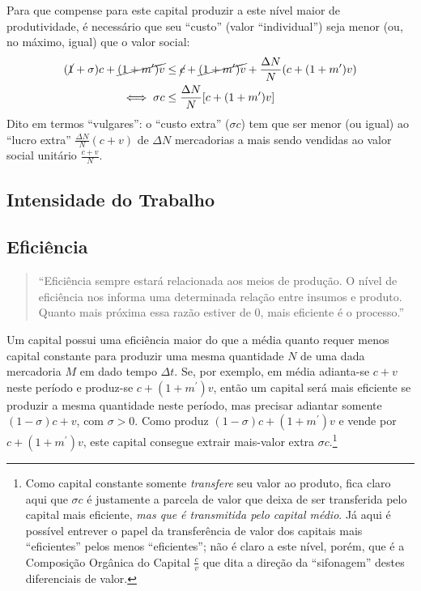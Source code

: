 \documentclass[12pt]{article}
\numberwithin{equation}{section}
\theoremstyle{plain}
\theoremstyle{definition}
\theoremstyle{remark}
\begin{document}
Para que compense para este capital produzir a este nível maior de produtividade, é necessário que seu ``custo'' (valor ``individual'') seja menor (ou, no máximo, igual) que o valor social: \begin{align*}
(\cancel{ 1 }+\sigma)c + \cancel{ (1 +m^{\prime})v } &\leq \cancel{ c }+\cancel{ (1+m^{\prime})v } + \frac{\Delta N}{N}(c+(1+m^{\prime})v) \\
\iff \sigma c & \leq \frac{\Delta N}{N}[c+(1+m^{\prime})v]
\end{align*} Dito em termos ``vulgares'': o ``custo extra'' (\(\sigma c\)) tem que ser menor (ou igual) ao ``lucro extra'' \(\frac{\Delta N}{N}(c+v)\) de \(\Delta N\) mercadorias a mais sendo vendidas ao valor social unitário \(\frac{c+v}{N}\).

\hypertarget{intensidade-do-trabalho}{%
\subsection{Intensidade do Trabalho}\label{intensidade-do-trabalho}}

\hypertarget{eficiuxeancia}{%
\subsection{Eficiência}\label{eficiuxeancia}}

\begin{quote}
``Eficiência sempre estará relacionada aos meios de produção. O nível de eficiência nos informa uma determinada relação entre insumos e produto. Quanto mais próxima essa razão estiver de \(0\), mais eficiente é o processo.'' \parencite[, p. 60]{SaBarreto2022}
\end{quote}

Um capital possui uma eficiência maior do que a média quanto requer menos capital constante para produzir uma mesma quantidade \(N\) de uma dada mercadoria \(M\) em dado tempo \(\Delta t\). Se, por exemplo, em média adianta-se \(c+v\) neste período e produz-se \(c+(1+m^{\prime})v\), então um capital será mais eficiente se produzir a mesma quantidade neste período, mas precisar adiantar somente \((1-\sigma)c + v\), com \(\sigma>0\). Como produz \((1-\sigma)c + (1+m^{\prime})v\) e vende por \(c+(1+m^{\prime})v\), este capital consegue extrair mais-valor extra \(\sigma c\).\footnote{Como capital constante somente \textit{transfere} seu valor ao produto, fica claro aqui que \(\sigma c\) é justamente a parcela de valor que deixa de ser transferida pelo capital mais eficiente, \textit{mas que é transmitida pelo capital médio}. Já aqui é possível entrever o papel da transferência de valor dos capitais mais ``eficientes'' pelos menos ``eficientes''; não é claro a este nível, porém, que é a Composição Orgânica do Capital \(\frac{c}{v}\) que dita a direção da ``sifonagem'' destes diferenciais de valor.}
\end{document}
